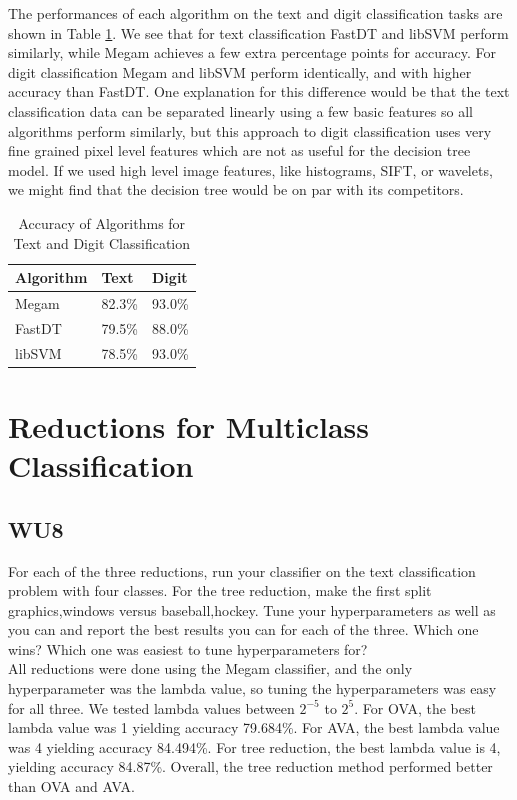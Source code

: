 \documentclass[a4paper,11pt]{article}
\begin{document}
The performances of each algorithm on the text and digit classification 
tasks are shown in Table \ref{tables:WU7}. We see that for text 
classification FastDT and libSVM perform similarly, while Megam achieves a 
few extra percentage points for accuracy. For digit classification Megam and 
libSVM perform identically, and with higher accuracy than FastDT. One 
explanation for this difference would be that the text classification data 
can be separated linearly using a few basic features so all algorithms 
perform similarly, but this approach to digit classification uses very fine 
grained pixel level features which are not as useful for the decision tree 
model. If we used high level image features, like histograms, SIFT, or 
wavelets, we might find that the decision tree would be on par with
its competitors.

\begin{table}[!ht]
\begin{center}
    \caption{Accuracy of Algorithms for Text and Digit Classification}
    \begin{tabular}{ | l | l | l |} \hline
    Algorithm & Text   & Digit \\ \hline
    Megam     & 82.3\% & 93.0\% \\ \hline
    FastDT    & 79.5\% & 88.0\% \\ \hline
    libSVM    & 78.5\% & 93.0\% \\ \hline
    \end{tabular}
    \label{tables:WU7}
\end{center}
\end{table}

\pagebreak
\section{Reductions for Multiclass Classification}
\subsection{WU8}
\textsf{For each of the three reductions, run your classifier on the
text classification problem with four classes. For the tree reduction, 
make the first split {graphics,windows} versus {baseball,hockey}. 
Tune your hyperparameters as well as you can and report the best 
results you can for each of the three. Which one wins? Which one was 
easiest to tune hyperparameters for?}\\

All reductions were done using the Megam classifier, 
and the only hyperparameter was the lambda value,
so tuning the hyperparameters was easy for all three.
We tested lambda values between $2^{-5}$ to $2^{5}$.
For OVA, the best lambda value was 1 yielding accuracy 79.684\%. 
For AVA, the best lambda value was 4 yielding accuracy 84.494\%. 
For tree reduction, the best lambda value is 4, yielding accuracy 84.87\%.
Overall, the tree reduction method performed better than OVA and AVA.
\end{document}
